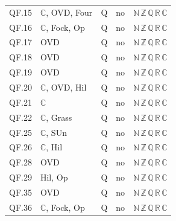 {\begin{longtable}{l p{6.8cm} c c l}
QF.15 & $\mathbb C$, \textsf{OVD}, \textsf{Four} & Q & no & $\mathbb N\,\mathbb Z\,\mathbb Q\,\mathbb R\,\mathbb C$ \\
QF.16 & $\mathbb C$, \textsf{Fock}, \textsf{Op} & Q & no & $\mathbb N\,\mathbb Z\,\mathbb Q\,\mathbb R\,\mathbb C$ \\
QF.17 & \textsf{OVD} & Q & no & $\mathbb N\,\mathbb Z\,\mathbb Q\,\mathbb R\,\mathbb C$ \\
QF.18 & \textsf{OVD} & Q & no & $\mathbb N\,\mathbb Z\,\mathbb Q\,\mathbb R\,\mathbb C$ \\
QF.19 & \textsf{OVD} & Q & no & $\mathbb N\,\mathbb Z\,\mathbb Q\,\mathbb R\,\mathbb C$ \\
QF.20 & $\mathbb C$, \textsf{OVD}, \textsf{Hil} & Q & no & $\mathbb N\,\mathbb Z\,\mathbb Q\,\mathbb R\,\mathbb C$ \\
QF.21 & $\mathbb C$ & Q & no & $\mathbb N\,\mathbb Z\,\mathbb Q\,\mathbb R\,\mathbb C$ \\
QF.22 & $\mathbb C$, \textsf{Grass} & Q & no & $\mathbb N\,\mathbb Z\,\mathbb Q\,\mathbb R\,\mathbb C$ \\
QF.25 & $\mathbb C$, \textsf{SUn} & Q & no & $\mathbb N\,\mathbb Z\,\mathbb Q\,\mathbb R\,\mathbb C$ \\
QF.26 & $\mathbb C$, \textsf{Hil} & Q & no & $\mathbb N\,\mathbb Z\,\mathbb Q\,\mathbb R\,\mathbb C$ \\
QF.28 & \textsf{OVD} & Q & no & $\mathbb N\,\mathbb Z\,\mathbb Q\,\mathbb R\,\mathbb C$ \\
QF.29 & \textsf{Hil}, \textsf{Op} & Q & no & $\mathbb N\,\mathbb Z\,\mathbb Q\,\mathbb R\,\mathbb C$ \\
QF.35 & \textsf{OVD} & Q & no & $\mathbb N\,\mathbb Z\,\mathbb Q\,\mathbb R\,\mathbb C$ \\
QF.36 & $\mathbb C$, \textsf{Fock}, \textsf{Op} & Q & no & $\mathbb N\,\mathbb Z\,\mathbb Q\,\mathbb R\,\mathbb C$ \\
\end{longtable}
}
